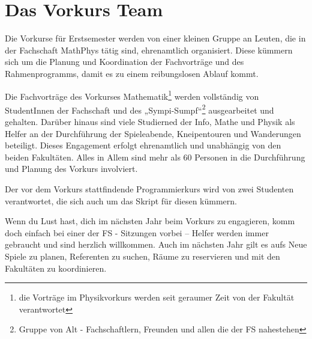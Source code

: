 \section{Das Vorkurs Team}
Die Vorkurse für Erstsemester werden von einer kleinen Gruppe an Leuten, die in
der Fachschaft MathPhys tätig sind, ehrenamtlich organisiert. Diese kümmern
sich um die Planung und Koordination der Fachvorträge und des Rahmenprogramms,
damit es zu einem reibungslosen Ablauf kommt.

Die Fachvorträge des Vorkurses Mathematik\footnote{die Vorträge im
Physikvorkurs werden seit geraumer Zeit von der Fakultät  verantwortet} werden
vollständig von StudentInnen der Fachschaft und des „Sympi-Sumpf“\footnote{Gruppe von Alt - Fachschaftlern, Freunden und allen die der FS
nahestehen} ausgearbeitet und gehalten. Darüber hinaus sind viele Studierned
der Info, Mathe und Physik als Helfer an der Durchführung der Spieleabende,
Kneipentouren und Wanderungen beteiligt. Dieses Engagement erfolgt ehrenamtlich
und unabhängig von den beiden Fakultäten. Alles in Allem sind mehr als 60
Personen in die Durchführung und Planung des Vorkurs involviert.

Der vor dem Vorkurs stattfindende Programmierkurs wird von zwei Studenten
verantwortet, die sich auch um das Skript für diesen kümmern.

Wenn du Lust hast, dich im nächsten Jahr beim Vorkurs zu engagieren, komm doch
einfach bei einer der FS - Sitzungen vorbei -- Helfer werden immer gebraucht
und sind herzlich willkommen. Auch im nächsten Jahr gilt es aufs Neue Spiele zu
planen, Referenten zu suchen, Räume zu reservieren und mit den Fakultäten zu
koordinieren.
